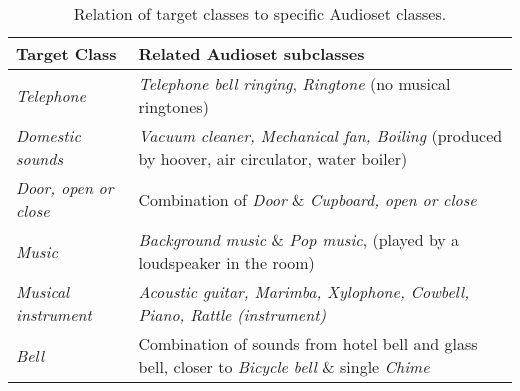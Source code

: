 \documentclass{article}
\begin{document}
\begin{sloppy}
\begin{table}[t]
\begin{tabular}{p{2.5cm}|p{5cm}}
\textbf{Target Class}        & \textbf{Related Audioset subclasses}                                                                                                       \\
\hline
\textit{Telephone}           & \emph{Telephone bell ringing}, \emph{Ringtone} (no musical ringtones)                                        \\
\hline
\textit{Domestic sounds}     & \emph{Vacuum cleaner, Mechanical fan, Boiling} (produced by hoover, air circulator, water boiler)\\
\hline
\textit{Door, open or close} & Combination of \emph{Door} \& \emph{Cupboard, open or close}                                                                                             \\
\hline
\textit{Music}               & \emph{Background music} \& \emph{Pop music},
(played by a loudspeaker in the room)                          \\
\hline
\textit{Musical instrument}  & \emph{Acoustic guitar, Marimba, Xylophone, Cowbell, Piano, Rattle (instrument)}                        \\
\hline
\textit{Bell}                & Combination of sounds from hotel bell and glass bell, closer to \emph{Bicycle bell} \& single \emph{Chime}
\end{tabular}
\caption{Relation of target classes to specific Audioset classes.}
\label{table:classes_audioset}
\end{table} \begin{table*}[ht]
\end{table*}
\end{sloppy}
\end{document}
